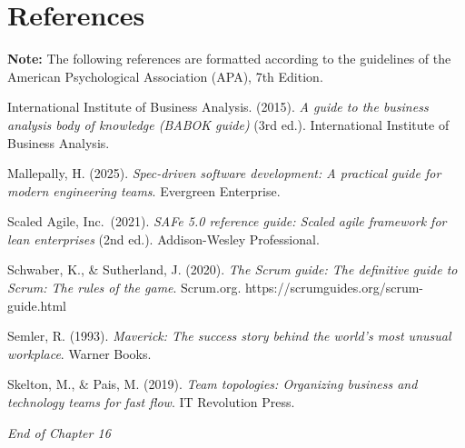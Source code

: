 \section{References}\label{references}

\textbf{Note:} The following references are formatted according to the
guidelines of the American Psychological Association (APA), 7th Edition.

International Institute of Business Analysis. (2015). \emph{A guide to
the business analysis body of knowledge (BABOK guide)} (3rd ed.).
International Institute of Business Analysis.

Mallepally, H. (2025). \emph{Spec-driven software development: A
practical guide for modern engineering teams}. Evergreen Enterprise.

Scaled Agile, Inc.~(2021). \emph{SAFe 5.0 reference guide: Scaled agile
framework for lean enterprises} (2nd ed.). Addison-Wesley Professional.

Schwaber, K., \& Sutherland, J. (2020). \emph{The Scrum guide: The
definitive guide to Scrum: The rules of the game}. Scrum.org.
https://scrumguides.org/scrum-guide.html

Semler, R. (1993). \emph{Maverick: The success story behind the world's
most unusual workplace}. Warner Books.

Skelton, M., \& Pais, M. (2019). \emph{Team topologies: Organizing
business and technology teams for fast flow}. IT Revolution Press.

\bigskip

\emph{End of Chapter 16}
